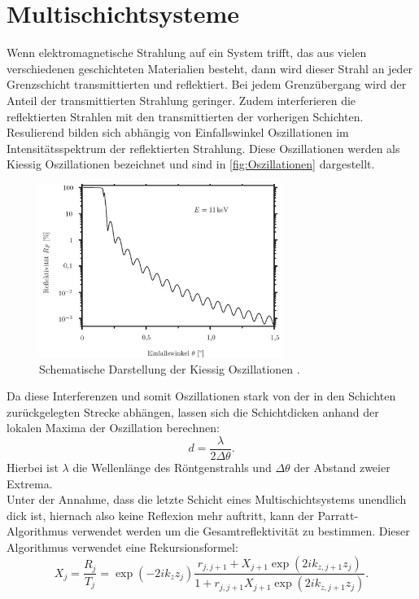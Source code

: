 \section{Multischichtsysteme}
Wenn elektromagnetische Strahlung auf ein System trifft, das aus vielen verschiedenen geschichteten Materialien besteht, dann wird dieser Strahl an jeder Grenzschicht transmittierten und reflektiert. 
Bei jedem Grenzübergang wird der Anteil der transmittierten Strahlung geringer. Zudem interferieren die reflektierten Strahlen mit den transmittierten der vorherigen Schichten. Resulierend bilden sich
abhängig von Einfallswinkel Oszillationen im Intensitätsspektrum der reflektierten Strahlung. Diese Oszillationen werden als Kiessig Oszillationen bezeichnet und sind in \autoref{fig:Oszillationen} dargestellt.
\begin{figure}
    \centering
    \includegraphics[width = 0.7\textwidth]{bilder/Oszillationen.png}
    \caption{Schematische Darstellung der Kiessig Oszillationen \cite{Kiessig}.}
    \label{fig:Oszillationen}
\end{figure}
Da diese Interferenzen und somit Oszillationen stark von der in den Schichten zurückgelegten Strecke abhängen, lassen sich die Schichtdicken anhand der lokalen Maxima der Oszillation berechnen:
\begin{equation}
    \label{eqn:Schichtdicke}
    d = \frac{\lambda}{2\Delta \theta}.
\end{equation}
Hierbei ist $\lambda$ die Wellenlänge des Röntgenstrahls und $\Delta \theta$ der Abstand zweier Extrema.\\
Unter der Annahme, dass die letzte Schicht eines Multischichtsystems unendlich dick ist, hiernach also keine Reflexion mehr auftritt, kann der Parratt-Algorithmus verwendet werden um die Gesamtreflektivität
zu bestimmen. Dieser Algorithmus verwendet eine Rekursionsformel:
\begin{equation}
    X_j = \frac{R_j}{T_j} = \exp{(-2ik_z  z_j)}\frac{r_{j,j+1}+X_{j+1}\exp{(2ik_{z,j+1}z_j)}}{1+r_{j,j+1}X_{j+1}\exp{(2ik_{z,j+1}z_j)}}.
\end{equation}
